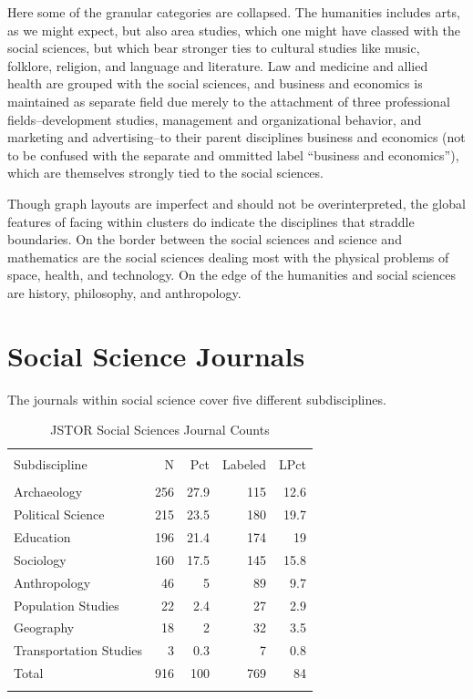\documentclass[]{book}
\begin{document}
Here some of the granular categories are collapsed. The humanities
includes arts, as we might expect, but also area studies, which one
might have classed with the social sciences, but which bear stronger
ties to cultural studies like music, folklore, religion, and language
and literature. Law and medicine and allied health are grouped with the
social sciences, and business and economics is maintained as separate
field due merely to the attachment of three professional
fields--development studies, management and organizational behavior, and
marketing and advertising--to their parent disciplines business and
economics (not to be confused with the separate and ommitted label
``business and economics''), which are themselves strongly tied to the
social sciences.

Though graph layouts are imperfect and should not be overinterpreted,
the global features of facing within clusters do indicate the
disciplines that straddle boundaries. On the border between the social
sciences and science and mathematics are the social sciences dealing
most with the physical problems of space, health, and technology. On the
edge of the humanities and social sciences are history, philosophy, and
anthropology.

\section{Social Science Journals}\label{kd-dq2}

The journals within social science cover five different subdisciplines.

\begin{table}[!htbp] \centering 
  \caption{JSTOR Social Sciences Journal Counts} 
  \label{tab:jclu-tab-sub} 
\begin{tabular}{@{\extracolsep{5pt}} lrrrr} 
\\[-1.8ex]\hline 
\hline \\[-1.8ex] 
Subdiscipline & N & Pct & Labeled & LPct \\ 
\hline \\[-1.8ex] 
Archaeology & 256 & 27.9 & 115 & 12.6 \\ 
Political Science & 215 & 23.5 & 180 & 19.7 \\ 
Education & 196 & 21.4 & 174 & 19 \\ 
Sociology & 160 & 17.5 & 145 & 15.8 \\ 
Anthropology & 46 & 5 & 89 & 9.7 \\ 
Population Studies & 22 & 2.4 & 27 & 2.9 \\ 
Geography & 18 & 2 & 32 & 3.5 \\ 
Transportation Studies & 3 & 0.3 & 7 & 0.8 \\ 
Total & 916 & 100 & 769 & 84 \\ 
\hline \\[-1.8ex] 
\end{tabular} 
\end{table}
\end{document}
